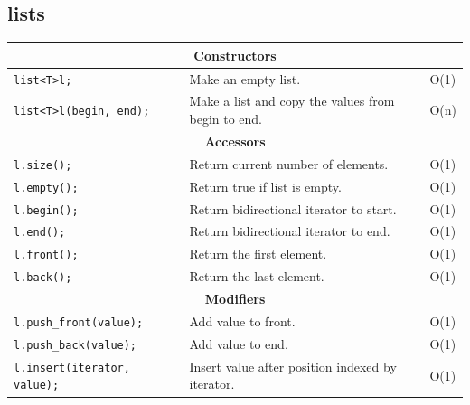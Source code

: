 \documentclass[12 pt, twoside] {article}
\begin{document}
{\subsection*{lists}
\begin{table}[h]
\centering
\begin{tabular}{|l|l|l|}
\hline
\multicolumn{3}{|c|}{\textbf{Constructors}}                                                                 \\ \hline
\texttt{list\textless T\textgreater l;            } & Make an empty list.                                & O(1)       \\ \hline
\texttt{list\textless T\textgreater l(begin, end);} & Make a list and copy the values from begin to end. & O(n)       \\ \hline
\multicolumn{3}{|c|}{\textbf{Accessors}}                                                                    \\ \hline
\texttt{l.size(); }                                & Return current number of elements.                 & O(1)       \\ \hline
\texttt{l.empty();}                                & Return true if list is empty.                      & O(1)       \\ \hline
\texttt{l.begin();}                                & Return bidirectional iterator to start.            & O(1)       \\ \hline
\texttt{l.end();  }                                & Return bidirectional iterator to end.              & O(1)       \\ \hline
\texttt{l.front();}                                & Return the first element.                          & O(1)       \\ \hline
\texttt{l.back(); }                                & Return the last element.                           & O(1)       \\ \hline
\multicolumn{3}{|c|}{\textbf{Modifiers}}                                                                    \\ \hline
\texttt{l.push\_front(value);      }               & Add value to front.                                & O(1)       \\ \hline
\texttt{l.push\_back(value);       }               & Add value to end.                                  & O(1)       \\ \hline
\texttt{l.insert(iterator, value); }               & Insert value after position indexed by iterator.   & O(1)       \\ \hline

\end{tabular}
\end{table}}
\end{document}

